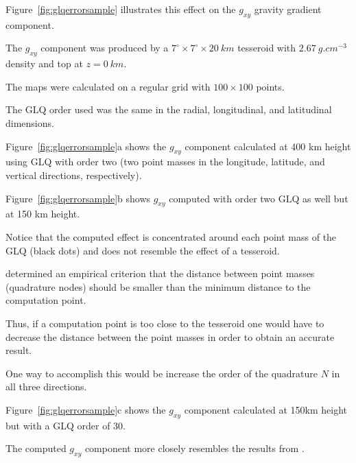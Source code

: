 \documentclass[manuscript]{geophysics}
\begin{document}
Figure~\ref{fig:glqerrorsample}
illustrates this effect on the $g_{xy}$ gravity gradient component.

The $g_{xy}$ component was produced by a
$7^\circ \times 7^\circ \times 20\ km$ tesseroid
with $2.67\ g.cm^{-3}$ density
and top at $z=0\ km$.

The maps were calculated on a regular grid
with $100\times100$ points.

The GLQ order used was the same
in the radial, longitudinal, and latitudinal dimensions.

Figure~\ref{fig:glqerrorsample}a shows the $g_{xy}$ component
calculated at 400 km height using
GLQ with order two (two point masses in the longitude, latitude, and vertical
directions, respectively).

Figure~\ref{fig:glqerrorsample}b shows $g_{xy}$ computed with order two
GLQ as well but at 150 km height.

Notice that the computed effect is concentrated around each point mass
of the GLQ (black dots) and does not resemble the effect of a tesseroid.

\citet{Ku1977} determined an empirical criterion that the distance between
point masses (quadrature nodes) should be smaller than the minimum distance to
the computation point.

Thus, if a computation point is too close to the tesseroid one would have to
decrease the distance between the point masses in order to obtain an accurate
result.

One way to accomplish this would be increase the order of the quadrature
$N$ in all three directions.

Figure~\ref{fig:glqerrorsample}c shows the $g_{xy}$ component calculated at
150km height but with a GLQ order of 30.

The computed $g_{xy}$ component more closely resembles the results from
\citet{Asgharzadeh2007}.
\end{document}
